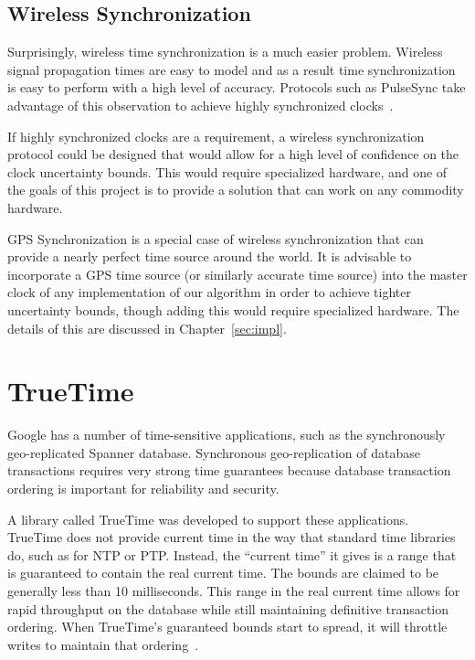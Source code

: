 \subsection{Wireless Synchronization}

Surprisingly, wireless time synchronization is a much easier
problem. Wireless signal propagation times are easy to model and as a
result time synchronization is easy to perform with a high level of
accuracy. Protocols such as PulseSync take advantage of this
observation to achieve highly synchronized clocks~\citep{Lenzen2010}.

If highly synchronized clocks are a requirement, a wireless
synchronization protocol could be designed that would allow for a high
level of confidence on the clock uncertainty bounds.  This would
require specialized hardware, and one of the goals of this project is
to provide a solution that can work on any commodity hardware.

GPS Synchronization is a special case of wireless synchronization that
can provide a nearly perfect time source around the world. It is
advisable to incorporate a GPS time source (or similarly accurate time
source) into the master clock of any implementation of our algorithm
in order to achieve tighter uncertainty bounds, though adding this
would require specialized hardware.  The details of this are discussed
in Chapter~\ref{sec:impl}.

\section{TrueTime}

Google has a number of time-sensitive applications, such as the
synchronously geo-replicated Spanner database. Synchronous
geo-replication of database transactions requires very strong time
guarantees because database transaction ordering is important for
reliability and security.

A library called TrueTime was developed to support these applications.
TrueTime does not provide current time in the way that standard time
libraries do, such as for NTP or PTP. Instead, the ``current time'' it
gives is a range that is guaranteed to contain the real current
time. The bounds are claimed to be generally less than 10
milliseconds. This range in the real current time allows for rapid
throughput on the database while still maintaining definitive
transaction ordering. When TrueTime's guaranteed bounds start to
spread, it will throttle writes to maintain that
ordering~\citep{Corbett2012}.

